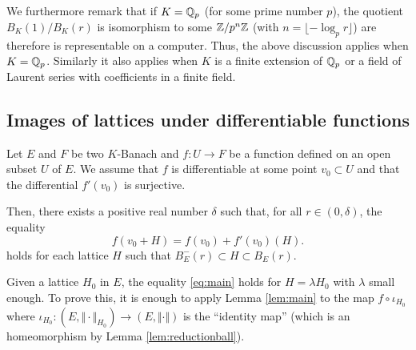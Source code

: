 \documentclass{lms}
\begin{document}
We furthermore remark that if $K = \mathbb Q_p$ (for some prime number $p$), 
the quotient $B_K(1)/B_K(r)$ is isomorphism to some $\mathbb Z/p^n\mathbb Z$ (with $n 
= \lfloor - \log_p r \rfloor$) are therefore is representable on a 
computer. Thus, the above discussion applies when $K = \mathbb Q_p$. Similarly 
it also applies when $K$ is a finite extension of $\mathbb Q_p$ or a field of
Laurent series with coefficients in a finite field.

\subsection{Images of lattices under differentiable functions}

\begin{lem} \label{lem:main}
Let $E$ and $F$ be two $K$-Banach and $f : U 
\rightarrow F$ be a function defined on an open subset $U$ of $E$.
We assume that $f$ is differentiable at some point $v_0 \subset 
U$ and that the differential $f'(v_0)$ is surjective. 

Then, there exists a positive real number $\delta$ such that, for all $r 
\in (0, \delta)$, the equality
\begin{equation}
\label{eq:main}
f(v_0 + H) = f(v_0) + f'(v_0) (H).
\end{equation}
holds for each lattice $H$ such that $B^-_E(r) \subset H \subset
B_E(r)$.
\end{lem}

\begin{rmk}
\label{rmk:mainlemma}
Given a lattice $H_0$ in $E$, the equality \eqref{eq:main} holds for $H 
= \lambda H_0$ with $\lambda$ small enough. To prove this, it is enough 
to apply Lemma \ref{lem:main} to the map $f \circ \iota_{H_0}$ where 
$\iota_{H_0} : (E, \Vert \cdot \Vert_{H_0}) \to (E, \Vert \cdot \Vert)$ 
is the ``identity map'' (which is an homeomorphism by Lemma 
\ref{lem:reductionball}).
\end{rmk}
\end{document}
